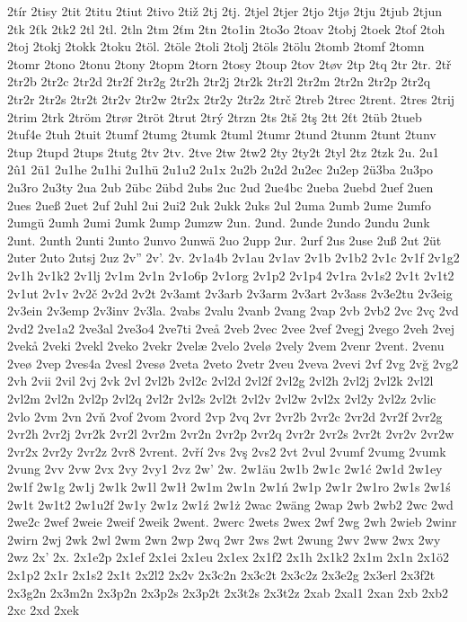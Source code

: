 2tír
2tisy
2tit
2titu
2tiut
2tivo
2tiž
2tj
2tj.
2tjel
2tjer
2tjo
2tjø
2tju
2tjub
2tjun
2tk
2ťk
2tk2
2tl
2tl.
2tln
2tm
2ťm
2tn
2to1in
2to3o
2toav
2tobj
2toek
2tof
2toh
2toj
2tokj
2tokk
2toku
2töl.
2töle
2toli
2tolj
2töls
2tölu
2tomb
2tomf
2tomn
2tomr
2tono
2tonu
2tony
2topm
2torn
2tosy
2toup
2tov
2tøv
2tp
2tq
2tr
2tr.
2tř
2tr2b
2tr2c
2tr2d
2tr2f
2tr2g
2tr2h
2tr2j
2tr2k
2tr2l
2tr2m
2tr2n
2tr2p
2tr2q
2tr2r
2tr2s
2tr2t
2tr2v
2tr2w
2tr2x
2tr2y
2tr2z
2trč
2treb
2trec
2trent.
2tres
2trij
2trim
2trk
2tröm
2trør
2tröt
2trut
2trý
2trzn
2ts
2tš
2tş
2tt
2ťt
2tüb
2tueb
2tuf4e
2tuh
2tuit
2tumf
2tumg
2tumk
2tuml
2tumr
2tund
2tunm
2tunt
2tunv
2tup
2tupd
2tups
2tutg
2tv
2tv.
2tve
2tw
2tw2
2ty
2ty2t
2tyl
2tz
2tzk
2u.
2u1
2û1
2ü1
2u1he
2u1hi
2u1hü
2u1u2
2u1x
2u2b
2u2d
2u2ec
2u2ep
2ü3ba
2u3po
2u3ro
2u3ty
2ua
2ub
2übc
2übd
2ubs
2uc
2ud
2ue4bc
2ueba
2uebd
2uef
2uen
2ues
2ueß
2uet
2uf
2uhl
2ui
2ui2
2uk
2ukk
2uks
2ul
2uma
2umb
2ume
2umfo
2umgü
2umh
2umi
2umk
2ump
2umzw
2un.
2und.
2unde
2undo
2undu
2unk
2unt.
2unth
2unti
2unto
2unvo
2unwä
2uo
2upp
2ur.
2urf
2us
2use
2uß
2ut
2üt
2uter
2uto
2utsj
2uz
2v''
2v'.
2v.
2v1a4b
2v1au
2v1av
2v1b
2v1b2
2v1c
2v1f
2v1g2
2v1h
2v1k2
2v1lj
2v1m
2v1n
2v1o6p
2v1org
2v1p2
2v1p4
2v1ra
2v1s2
2v1t
2v1t2
2v1ut
2v1v
2v2č
2v2d
2v2t
2v3amt
2v3arb
2v3arm
2v3art
2v3ass
2v3e2tu
2v3eig
2v3ein
2v3emp
2v3inv
2v3la.
2vabs
2valu
2vanb
2vang
2vap
2vb
2vb2
2vc
2vç
2vd
2vd2
2ve1a2
2ve3al
2ve3o4
2ve7ti
2veå
2veb
2vec
2vee
2vef
2vegj
2vego
2veh
2vej
2vekå
2veki
2vekl
2veko
2vekr
2velæ
2velo
2velø
2vely
2vem
2venr
2vent.
2venu
2veø
2vep
2ves4a
2vesl
2vesø
2veta
2veto
2vetr
2veu
2veva
2vevi
2vf
2vg
2vğ
2vg2
2vh
2vii
2vil
2vj
2vk
2vl
2vl2b
2vl2c
2vl2d
2vl2f
2vl2g
2vl2h
2vl2j
2vl2k
2vl2l
2vl2m
2vl2n
2vl2p
2vl2q
2vl2r
2vl2s
2vl2t
2vl2v
2vl2w
2vl2x
2vl2y
2vl2z
2vlic
2vlo
2vm
2vn
2vň
2vof
2vom
2vord
2vp
2vq
2vr
2vr2b
2vr2c
2vr2d
2vr2f
2vr2g
2vr2h
2vr2j
2vr2k
2vr2l
2vr2m
2vr2n
2vr2p
2vr2q
2vr2r
2vr2s
2vr2t
2vr2v
2vr2w
2vr2x
2vr2y
2vr2z
2vr8
2vrent.
2vří
2vs
2vş
2vs2
2vt
2vul
2vumf
2vumg
2vumk
2vung
2vv
2vw
2vx
2vy
2vy1
2vz
2w'
2w.
2w1äu
2w1b
2w1c
2w1ć
2w1d
2w1ey
2w1f
2w1g
2w1j
2w1k
2w1l
2w1ł
2w1m
2w1n
2w1ń
2w1p
2w1r
2w1ro
2w1s
2w1ś
2w1t
2w1t2
2w1u2f
2w1y
2w1z
2w1ź
2w1ż
2wac
2wäng
2wap
2wb
2wb2
2wc
2wd
2we2c
2wef
2weie
2weif
2weik
2went.
2werc
2wets
2wex
2wf
2wg
2wh
2wieb
2winr
2wirn
2wj
2wk
2wl
2wm
2wn
2wp
2wq
2wr
2ws
2wt
2wung
2wv
2ww
2wx
2wy
2wz
2x'
2x.
2x1e2p
2x1ef
2x1ei
2x1eu
2x1ex
2x1f2
2x1h
2x1k2
2x1m
2x1n
2x1ö2
2x1p2
2x1r
2x1s2
2x1t
2x2l2
2x2v
2x3c2n
2x3c2t
2x3c2z
2x3e2g
2x3erl
2x3f2t
2x3g2n
2x3m2n
2x3p2n
2x3p2s
2x3p2t
2x3t2s
2x3t2z
2xab
2xal1
2xan
2xb
2xb2
2xc
2xd
2xek
